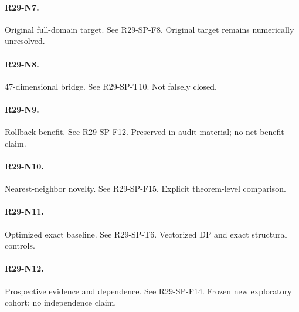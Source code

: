 \paragraph{R29-N7.} Original full-domain target. See R29-SP-F8. Original target remains numerically unresolved.
\paragraph{R29-N8.} 47-dimensional bridge. See R29-SP-T10. Not falsely closed.
\paragraph{R29-N9.} Rollback benefit. See R29-SP-F12. Preserved in audit material; no net-benefit claim.
\paragraph{R29-N10.} Nearest-neighbor novelty. See R29-SP-F15. Explicit theorem-level comparison.
\paragraph{R29-N11.} Optimized exact baseline. See R29-SP-T6. Vectorized DP and exact structural controls.
\paragraph{R29-N12.} Prospective evidence and dependence. See R29-SP-F14. Frozen new exploratory cohort; no independence claim.

